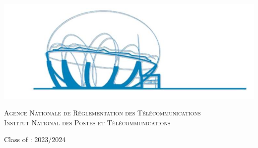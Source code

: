 \begin{center}
\begin{tabular}{p{1cm}lll}
\end{tabular}

\vspace{0.5cm}
\includegraphics[scale=0.55]{Logos/ZLAFA.png}


\textsc{Agence Nationale de Réglementation des Télécommunications}\\
\textsc{Institut National des Postes et Télécommunications}

{\large Class of : 2023/2024}
   
\end{center}


